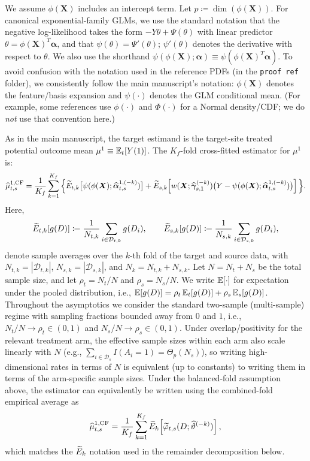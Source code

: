 \documentclass{article}
\begin{document}
We assume $\phi(\boldsymbol{X})$ includes an intercept term.
Let $p \coloneqq \dim(\phi(\boldsymbol{X}))$.
For canonical exponential-family GLMs, we use the standard notation that the negative log-likelihood takes the form $-Y\theta+\Psi(\theta)$ with linear predictor $\theta=\phi(\boldsymbol{X})^T\boldsymbol{\alpha}$, and that $\psi(\theta)=\Psi'(\theta)$; $\psi'(\theta)$ denotes the derivative with respect to $\theta$. We also use the shorthand $\psi(\phi(\boldsymbol{X});\boldsymbol{\alpha}) \equiv \psi(\phi(\boldsymbol{X})^T\boldsymbol{\alpha})$.
To avoid confusion with the notation used in the reference PDFs (in the \texttt{proof ref} folder), we consistently follow the main manuscript's notation: $\phi(\boldsymbol{X})$ denotes the feature/basis expansion and $\psi(\cdot)$ denotes the GLM conditional mean. (For example, some references use $\phi(\cdot)$ and $\Phi(\cdot)$ for a Normal density/CDF; we do \emph{not} use that convention here.)

As in the main manuscript, the target estimand is the target-site treated potential outcome mean $\mu^1 \equiv \operatorname{\mathbb{E}}_t[Y(1)]$.
The $K_f$-fold cross-fitted estimator for $\mu^1$ is:
\begin{align*}
\widehat{\mu}^{1,\mathrm{CF}}_{t,s}
= \frac{1}{K_f}\sum_{k=1}^{K_f}
\Big\{
    \widetilde{E}_{t,k}\big[\psi(\phi(\boldsymbol{X}); \widehat{\boldsymbol{\alpha}}_{t,s}^{1,(-k)})\big]
    + \widetilde{E}_{s,k}\!\left[
        w(\boldsymbol{X};\widehat{\boldsymbol{\gamma}}_{s,1}^{(-k)})
        \big(Y - \psi(\phi(\boldsymbol{X}); \widehat{\boldsymbol{\alpha}}_{t,s}^{1,(-k)})\big)
    \right]
\Big\}.
\end{align*}
Here,
\[
\widetilde{E}_{t,k}[g(D)] \coloneqq \frac{1}{N_{t,k}}\sum_{i \in \mathcal{D}_{t,k}} g(D_i),
\qquad
\widetilde{E}_{s,k}[g(D)] \coloneqq \frac{1}{N_{s,k}}\sum_{i \in \mathcal{D}_{s,k}} g(D_i),
\]
denote sample averages over the $k$-th fold of the target and source data, with $N_{t,k} = |\mathcal{D}_{t,k}|$, $N_{s,k} = |\mathcal{D}_{s,k}|$, and $N_k = N_{t,k}+N_{s,k}$.
Let $N = N_t + N_s$ be the total sample size, and let $\rho_t = N_t/N$ and $\rho_s = N_s/N$.
We write $\operatorname{\mathbb{E}}[\cdot]$ for expectation under the pooled distribution, i.e., $\operatorname{\mathbb{E}}[g(D)] = \rho_t \operatorname{\mathbb{E}}_t[g(D)] + \rho_s \operatorname{\mathbb{E}}_s[g(D)]$.
Throughout the asymptotics we consider the standard two-sample (multi-sample) regime with sampling fractions bounded away from $0$ and $1$, i.e., $N_t/N\to\rho_t\in(0,1)$ and $N_s/N\to\rho_s\in(0,1)$. Under overlap/positivity for the relevant treatment arm, the effective sample sizes within each arm also scale linearly with $N$ (e.g., $\sum_{i\in\mathcal{D}_s}I(A_i=1)=\Theta_p(N_s)$), so writing high-dimensional rates in terms of $N$ is equivalent (up to constants) to writing them in terms of the arm-specific sample sizes.
Under the balanced-fold assumption above, the estimator can equivalently be written using the combined-fold empirical average as
\[
\widehat{\mu}^{1,\mathrm{CF}}_{t,s}
= \frac{1}{K_f}\sum_{k=1}^{K_f}\widetilde{E}_k\!\left[\widetilde{\varphi}_{t,s}(D; \widehat{\vartheta}^{(-k)})\right],
\]
which matches the $\widetilde{E}_k$ notation used in the remainder decomposition below.
\end{document}
